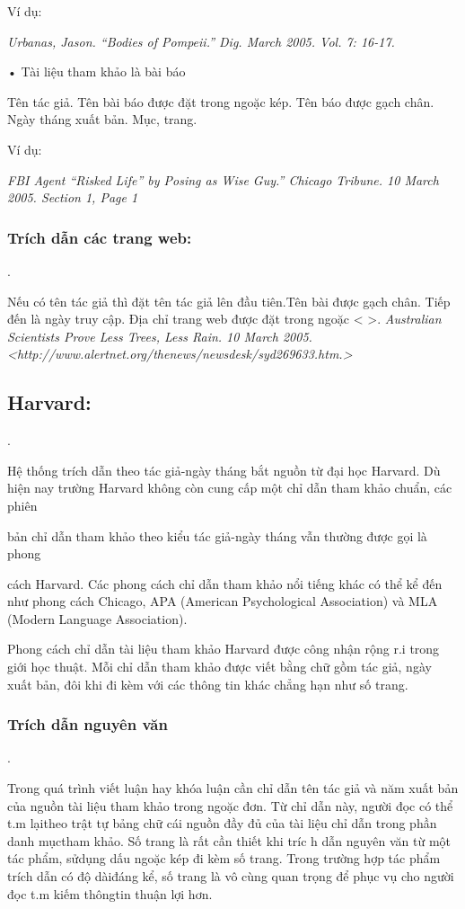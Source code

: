 \documentclass{hcmutarticle}
\begin{document}
Ví dụ:

{\em Urbanas, Jason. “Bodies of Pompeii.” Dig. March 2005. Vol. 7: 16-17.}


•	Tài liệu tham khảo là bài báo

Tên tác giả. Tên bài báo được đặt trong ngoặc kép. Tên báo được gạch chân. Ngày tháng xuất bản. Mục, trang.

Ví dụ:

{\em FBI Agent “Risked Life” by Posing as Wise Guy.” Chicago Tribune. 10 March 2005. Section 1, Page 1}


\subsubsection{ Trích dẫn các trang web:}.

Nếu có tên tác giả thì đặt tên tác giả lên đầu tiên.Tên bài được gạch chân. Tiếp đến là ngày truy cập. Địa chỉ trang web được đặt trong ngoặc < >.
{\em Australian Scientists Prove Less Trees, Less Rain. 10 March 2005. <http://www.alertnet.org/thenews/newsdesk/syd269633.htm.>}
\subsection{Harvard:}.

Hệ thống trích dẫn theo tác giả-ngày tháng bắt nguồn từ đại học Harvard. Dù hiện nay trường Harvard không còn cung cấp một chỉ dẫn tham khảo chuẩn, các phiên

bản chỉ dẫn tham khảo theo kiểu tác giả-ngày tháng vẫn thường được gọi là phong

cách Harvard. Các phong cách chỉ dẫn tham khảo nổi tiếng khác có thể kể đến như
phong cách Chicago, APA (American Psychological Association) và MLA (Modern
Language Association).

Phong cách chỉ dẫn tài liệu tham khảo Harvard được công nhận rộng r.i trong giới học thuật. Mỗi chỉ dẫn tham khảo được viết bằng chữ gồm tác giả, ngày xuất bản, đôi khi đi kèm với các thông tin khác chẳng hạn như số trang.

\subsubsection{	Trích dẫn nguyên văn}.

Trong quá trình viết luận hay khóa luận cần chỉ dẫn tên tác giả và năm xuất bản của nguồn tài liệu tham khảo trong ngoặc đơn. Từ chỉ dẫn này, người đọc có thể t.m lạitheo trật tự bảng chữ cái nguồn đầy đủ của tài liệu chỉ dẫn trong phần danh mụctham khảo. Số trang là rất cần thiết khi tríc h dẫn nguyên văn từ một tác phẩm, sửdụng dấu ngoặc kép đi kèm số trang. Trong trường hợp tác phẩm trích dẫn có độ dàiđáng kể, số trang là vô cùng quan trọng để phục vụ cho người đọc t.m kiếm thôngtin thuận lợi hơn.
\end{document}
